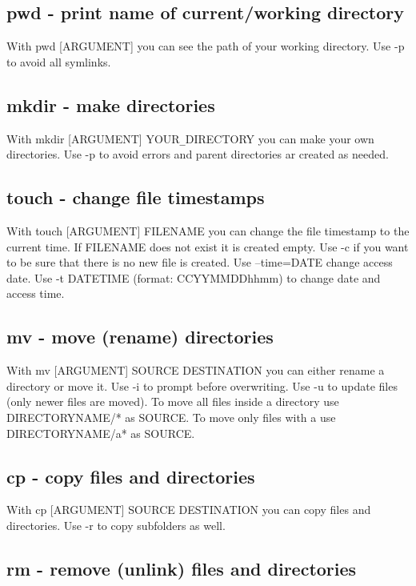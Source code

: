 \documentclass[10pt,a4paper]{scrartcl}
\begin{document}
\subsection{pwd - print name of current/working directory}

With pwd [ARGUMENT] you can see the path of your working directory. Use -p to avoid all symlinks.

\subsection{mkdir - make directories}

With mkdir [ARGUMENT] YOUR\verb$_$DIRECTORY you can make your own directories. Use -p to avoid errors and parent directories ar created as needed.

\subsection{touch - change file timestamps}

With touch [ARGUMENT] FILENAME you can change the file timestamp to the current time. If FILENAME does not exist it is created empty. Use -c if you want to be sure that there is no new file is created. Use --time=DATE change access date. Use -t DATETIME (format: CCYYMMDDhhmm) to change date and access time.

\subsection{mv - move (rename) directories}

With mv [ARGUMENT] SOURCE DESTINATION you can either rename a directory or move it. Use -i to prompt before overwriting. Use -u to update files (only newer files are moved). To move all files inside a directory use DIRECTORYNAME/* as SOURCE. To move only files with a use DIRECTORYNAME/a* as SOURCE.

\subsection{cp - copy files and directories}

With cp [ARGUMENT] SOURCE DESTINATION you can copy files and directories. Use -r to copy subfolders as well.

\subsection{rm - remove (unlink) files and directories}
\end{document}
